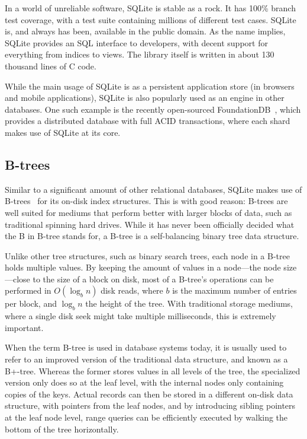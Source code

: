 In a world of unreliable software, SQLite is stable as a rock. It has 100\%
branch test coverage, with a test suite containing millions of different test
cases. SQLite is, and always has been, available in the public domain. As the
name implies, SQLite provides an SQL interface to developers, with decent support
for everything from indices to views. The library itself is written in about 130
thousand lines of C code.

While the main usage of SQLite is as a persistent application store (\eg in
browsers and mobile applications), SQLite is also popularly used as an engine in
other databases. One such example is the recently open-sourced
FoundationDB~\cite{foundation}, which provides a distributed database with full
ACID transactions, where each shard makes use of SQLite at its core.

\subsection{B-trees}\label{sec:btree}
Similar to a significant amount of other relational databases, SQLite makes use
of B-trees~\cite{btree} for its on-disk index structures. This is with good
reason: B-trees are well suited for mediums that perform better with larger
blocks of data, such as traditional spinning hard drives. While it has never
been officially decided what the B in B-tree stands for, a B-tree is a
self-balancing binary tree data structure.

Unlike other tree structures, such as binary search trees, each node in a B-tree
holds multiple values. By keeping the amount of values in a node---the node
size---close to the size of a block on disk, most of a B-tree's operations can
be performed in $ O(\log_b n) $ disk reads, where $ b $ is the maximum number of
entries per block, and $ \log_b n $ the height of the tree. With traditional
storage mediums, where a single disk seek might take multiple milliseconds, this
is extremely important.


When the term B-tree is used in database systems today, it is usually used to
refer to an improved version of the traditional data structure, and known as a
B+-tree. Whereas the former stores values in all levels of the tree, the
specialized version only does so at the leaf level, with the internal nodes only
containing copies of the keys. Actual records can then be stored in a different
on-disk data structure, with pointers from the leaf nodes, and by introducing
sibling pointers at the leaf node level, range queries can be efficiently
executed by walking the bottom of the tree horizontally.

